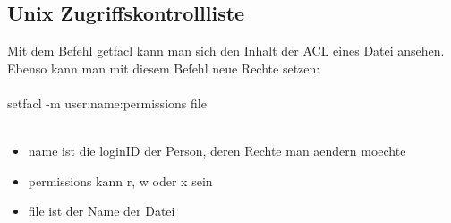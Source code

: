 \documentclass[a4paper]{scrreprt}
\begin{document}
\subsection{Unix Zugriffskontrollliste}
Mit dem Befehl getfacl kann man sich den Inhalt der ACL eines Datei ansehen.
Ebenso kann man mit diesem Befehl neue Rechte setzen:\\\\
setfacl -m user:name:permissions file\\\\
\begin{itemize}
	\item name ist die loginID der Person, deren Rechte man aendern moechte
	\item permissions kann r, w oder x sein
	\item file ist der Name der Datei
\end{itemize}
\end{document}
